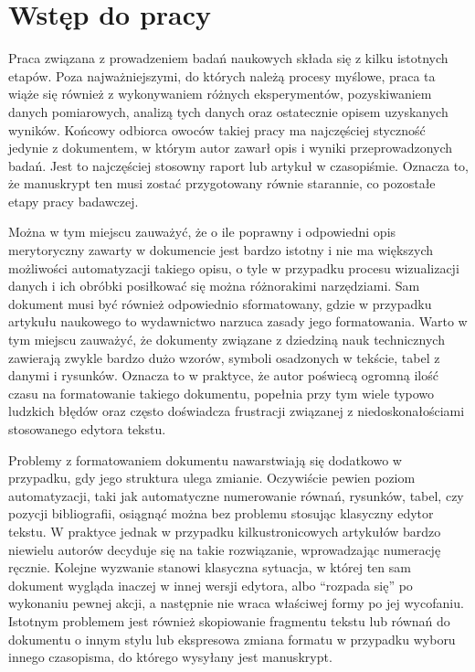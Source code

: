 \chapter{Wstęp do pracy}

Praca związana z prowadzeniem badań naukowych składa się z kilku istotnych etapów. Poza najważniejszymi, do których należą procesy myślowe, praca ta wiąże się również z wykonywaniem różnych eksperymentów, pozyskiwaniem danych pomiarowych, analizą tych danych oraz ostatecznie opisem uzyskanych wyników. Końcowy odbiorca owoców takiej pracy ma najczęściej styczność jedynie z dokumentem, w którym autor zawarł opis i wyniki przeprowadzonych badań. Jest to najczęściej stosowny raport lub artykuł w czasopiśmie. Oznacza to, że manuskrypt ten musi zostać przygotowany równie starannie, co pozostałe etapy pracy badawczej.

Można w tym miejscu zauważyć, że o ile poprawny i odpowiedni opis merytoryczny zawarty w dokumencie jest bardzo istotny i nie ma większych możliwości automatyzacji takiego opisu, o tyle w przypadku procesu wizualizacji danych i ich obróbki posiłkować się można różnorakimi narzędziami. Sam dokument musi być również odpowiednio sformatowany, gdzie w przypadku artykułu naukowego to wydawnictwo narzuca zasady jego formatowania. Warto w tym miejscu zauważyć, że dokumenty związane z dziedziną nauk technicznych zawierają zwykle bardzo dużo wzorów, symboli osadzonych w tekście, tabel z danymi i rysunków. Oznacza to w praktyce, że autor poświecą ogromną ilość czasu na formatowanie takiego dokumentu, popełnia przy tym wiele typowo ludzkich błędów oraz często doświadcza frustracji związanej z niedoskonałościami stosowanego edytora tekstu.

Problemy z formatowaniem dokumentu nawarstwiają się dodatkowo w przypadku, gdy jego struktura ulega zmianie. Oczywiście pewien poziom automatyzacji, taki jak automatyczne numerowanie równań, rysunków, tabel, czy pozycji bibliografii, osiągnąć można bez problemu stosując klasyczny edytor tekstu. W praktyce jednak w przypadku kilkustronicowych artykułów bardzo niewielu autorów decyduje się na takie rozwiązanie, wprowadzając numerację ręcznie. Kolejne wyzwanie stanowi klasyczna sytuacja, w której ten sam dokument wygląda inaczej w innej wersji edytora, albo \enquote{rozpada się} po wykonaniu pewnej akcji, a następnie nie wraca właściwej formy po jej wycofaniu. Istotnym problemem jest również skopiowanie fragmentu tekstu lub równań do dokumentu o innym stylu lub ekspresowa zmiana formatu w przypadku wyboru innego czasopisma, do którego wysyłany jest manuskrypt.

